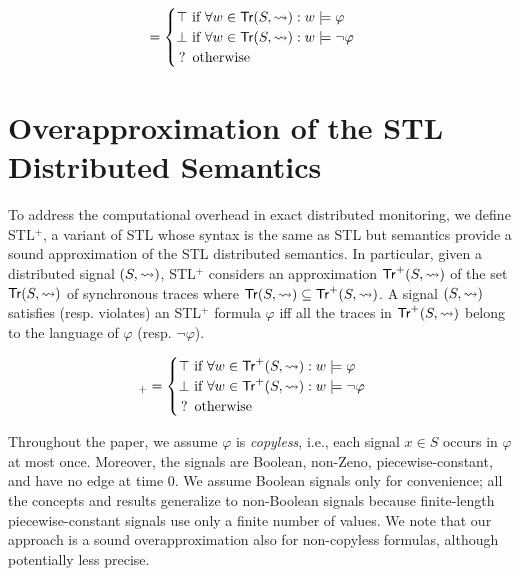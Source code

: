\begin{equation*}
	[(S,{\hb}) \models \varphi] = 
	\begin{cases}
		\top \text{ if } \forall w \in \tr(S,{\hb}) : w \models \varphi \\
		\bot \text{ if } \forall w \in \tr(S,{\hb}) : w \models \lnot\varphi \\
		\,?\, \text{ otherwise}
	\end{cases}
\end{equation*}



\section{Overapproximation of the STL Distributed Semantics}
\label{sec:semantics}

To address the computational overhead in exact distributed monitoring, we define STL$^+$, a variant of STL whose syntax is the same as STL but semantics provide a sound approximation of the STL distributed semantics.
In particular, given a distributed signal $(S,{\rightsquigarrow})$, STL$^+$ considers an approximation 
$\mathsf{Tr}^+(S,{\rightsquigarrow})$ of the set $\mathsf{Tr}(S,{\rightsquigarrow})$ of synchronous traces where $ \mathsf{Tr}(S,{\rightsquigarrow}) \subseteq \mathsf{Tr}^+(S,{\rightsquigarrow})$.
A signal $(S,{\rightsquigarrow})$ satisfies (resp. violates) an STL$^+$ formula $\varphi$ iff all the traces in $\mathsf{Tr}^+(S,{\rightsquigarrow})$ belong to the language of $\varphi$ (resp. $\lnot \varphi$).

\begin{equation*}
	[(S,{\hb}) \models \varphi]_+ = 
	\begin{cases}
		\top \text{ if } \forall w \in \tr^+(S,{\hb}) : w \models \varphi \\
		\bot \text{ if } \forall w \in \tr^+(S,{\hb}) : w \models \lnot\varphi \\
		\,?\, \text{ otherwise}
	\end{cases}
\end{equation*}

Throughout the paper, we assume  $\varphi$ is \emph{copyless}, i.e., each signal $x \in S$ occurs in $\varphi$ at most once.
Moreover, the signals are Boolean, non-Zeno, piecewise-constant, and have no edge at time 0.
We assume Boolean signals only for convenience; all the concepts and results generalize to non-Boolean signals because finite-length piecewise-constant signals use only a finite number of values.
We note that our approach is a sound overapproximation also for non-copyless formulas, although potentially less precise.



